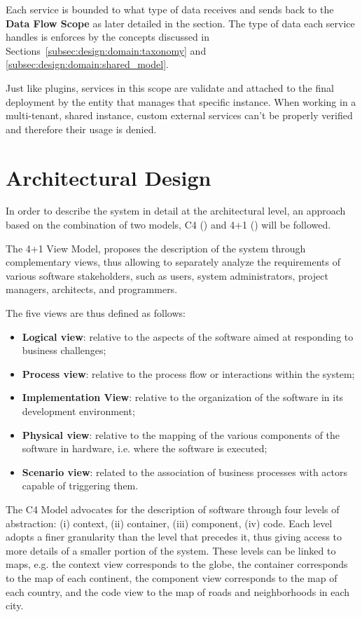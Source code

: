 Each service is bounded to what type of data receives and sends back to the \textbf{Data Flow Scope} as later detailed in the  section. The type of data each service handles is enforces by the concepts discussed in Sections~\ref{subsec:design:domain:taxonomy} and \ref{subsec:design:domain:shared_model}.

Just like plugins, services in this scope are validate and attached to the final deployment by the entity that manages that specific instance. When working in a multi-tenant, shared instance, custom external services can't be properly verified and therefore their usage is denied.

\section{Architectural Design}
\label{sec:design:architecture}

In order to describe the system in detail at the architectural level, an approach based on the combination of two models, C4 (\cite{c4model-site}) and 4+1 (\cite{4plus1model}) will be followed.

The 4+1 View Model, proposes the description of the system through complementary views, thus allowing to separately analyze the requirements of various software stakeholders, such as users, system administrators, project managers, architects, and programmers.

The five views are thus defined as follows:
\begin{itemize}
   \item \textbf{Logical view}: relative to the aspects of the software aimed at responding to business challenges;
   \item \textbf{Process view}: relative to the process flow or interactions within the system;
   \item \textbf{Implementation View}: relative to the organization of the software in its development environment;
   \item \textbf{Physical view}: relative to the mapping of the various components of the software in hardware, i.e. where the software is executed;
   \item \textbf{Scenario view}: related to the association of business processes with actors capable of triggering them.
\end{itemize}

The C4 Model advocates for the description of software through four levels of abstraction:
(i) context, (ii) container, (iii) component, (iv) code. Each level adopts a finer granularity than the level that precedes it, thus giving access to more details of a smaller portion of the system.
These levels can be linked to maps, e.g. the context view corresponds to the globe, the container corresponds to the map of each continent, the component view corresponds to the map of each country, and the code view to the map of roads and neighborhoods in each city.


